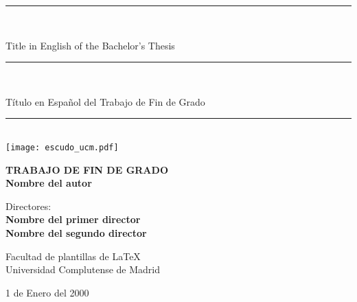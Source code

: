 \begin{titlepage}
	\thispagestyle{empty}

	\begin{center}

		\vspace{1cm}

		\vspace{0.65cm}
		\rule{2in}{0.5pt}\\
		\vspace{0.85cm}

		{\Large Title in English of the Bachelor's Thesis}\\

		\vspace{0.65cm}
		\rule{2in}{0.5pt}\\
		\vspace{0.85cm}

		{\Large Título en Español del Trabajo de Fin de Grado}\\

		\vspace{0.65cm}
		\rule{2in}{0.5pt}\\



		\vfill
		\texttt{[image: escudo\_ucm.pdf]}
		\vfill

		

		\textbf{TRABAJO DE FIN DE GRADO}\\
		\vspace{0.7cm}
		\textbf{Nombre del autor}

		\vspace{1cm}

		Directores:\\
		\textbf{Nombre del primer director}\\
		\textbf{Nombre del segundo director}

		\vspace{1.8cm}
		Facultad de plantillas de \LaTeX\\
		Universidad Complutense de Madrid
		\vspace{0.5cm}
	   
		1 de Enero del 2000

		\vspace{0.2cm}

	\end{center}
\end{titlepage}